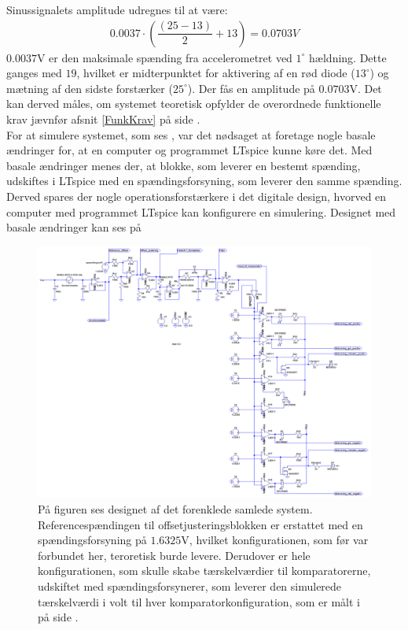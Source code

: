 \noindent Sinussignalets amplitude udregnes til at være:
\begin{eqnarray}
0.0037 \cdot (\dfrac{(25-13)}{2} + 13) = 0.0703V
\end{eqnarray}
\noindent $0.0037$V er den maksimale spænding fra accelerometret ved $1^{\circ}$ hældning. Dette ganges med $19$, hvilket er midterpunktet for aktivering af en rød diode ($13^{\circ}$) og mætning af den sidste forstærker ($25^{\circ}$). Der fås en amplitude på $0.0703$V. Det kan derved måles, om systemet teoretisk opfylder de overordnede funktionelle krav jævnfør afsnit \ref{FunkKrav} på side \pageref{FunkKrav}.\\
For at simulere systemet, som ses , var det nødsaget at foretage nogle basale ændringer for, at en computer og programmet LTspice kunne køre det. Med basale ændringer menes der, at blokke, som leverer en bestemt spænding, udskiftes i LTspice med en spændingsforsyning, som leverer den samme spænding. Derved spares der nogle operationsforstærkere i det digitale design, hvorved en computer med programmet LTspice kan konfigurere en simulering. Designet med basale ændringer kan ses på 
\begin{figure}[H]
	\centering
	\includegraphics[scale=.38]{figures/cProblemloesning/Samlet_system2_sim.PNG}
	\caption{På figuren ses designet af det forenklede samlede system. Referencespændingen til offsetjusteringsblokken er erstattet med en spændingsforsyning på $1.6325$V, hvilket konfigurationen, som før var forbundet her, teroretisk burde levere. Derudover er hele konfigurationen, som skulle skabe tærskelværdier til komparatorerne, udskiftet med spændingsforsynerer, som leverer den simulerede tærskelværdi i volt til hver komparatorkonfiguration, som er målt i  på side \pageref{Tab:test_reference1}.}
	\label{fig:samlet_system}
\end{figure}
